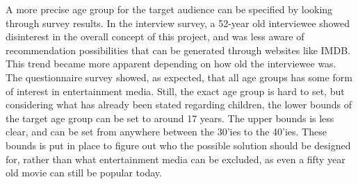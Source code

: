 A more precise age group for the target audience can be specified by looking through survey results. In the interview survey, a 52-year old interviewee showed disinterest in the overall concept of this project, and was less aware of recommendation possibilities that can be generated through websites like IMDB. This trend became more apparent depending on how old the interviewee was. The questionnaire survey showed, as expected, that all age groups has some form of interest in entertainment media. Still, the exact age group is hard to set, but considering what has already been stated regarding children, the lower bounds of the target age group can be set to around 17 years. The upper bounds is less clear, and can be set from anywhere between the 30’ies to the 40’ies. These bounds is put in place to figure out who the possible solution should be designed for, rather than what entertainment media can be excluded, as even a fifty year old movie can still be popular today.